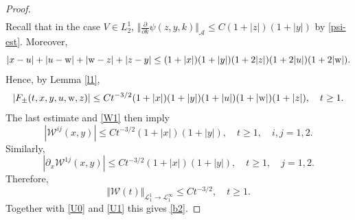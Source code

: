 \documentclass[reqno]{amsart}
\newcommand{\cL}{{\mathcal L}}
\numberwithin{equation}{section}
\begin{document}
\begin{proof}
\begin{eqnarray}
\end{eqnarray}
Recall that in the case $V\in L^1_2$,
$\Vert \frac{\partial}{\partial k}\psi(z,y,k)\Vert_{\mathcal A}\le C(1+|z|)(1+|y|)$  by \eqref{psi-est}. 
Moreover,
\[
|x-u|+|u-{\rm w}|+|{\rm w}-z|+|z-y|\le (1+|x|)(1+|y|)(1+2|z|) (1+2|u|)(1+2|{\rm w}|).
\] 
Hence, by Lemma \ref{l1}, 
\[
|F_{\pm}(t,x,y,u,{\rm w},z) |\le Ct^{-3/2} (1+|x|)(1+|y|)(1+|u|)(1+|{\rm w}|)(1+|z|),\quad t\ge 1.
\]
The last estimate and \eqref{W1}  then imply
\[
|{\mathcal W}^{ij}(x,y)|\le  Ct^{-3/2} (1+|x|)(1+|y|),\quad t\ge 1,\quad i,j=1,2.
\] 
Similarly,
\[
|\partial_x {\mathcal W}^{1j}(x,y)|\le  Ct^{-3/2} (1+|x|)(1+|y|),\quad t\ge 1,\quad j=1,2.
\]
Therefore,
\[
\Vert {\mathcal W}(t)\Vert_{\cL^1_1\to\cL^\infty_1}\le  Ct^{-3/2}, \quad t\ge 1.
\]
Together with  \eqref{U0} and \eqref{U1} this gives \eqref{b2}.
\end{proof}
\appendix
\end{document}
